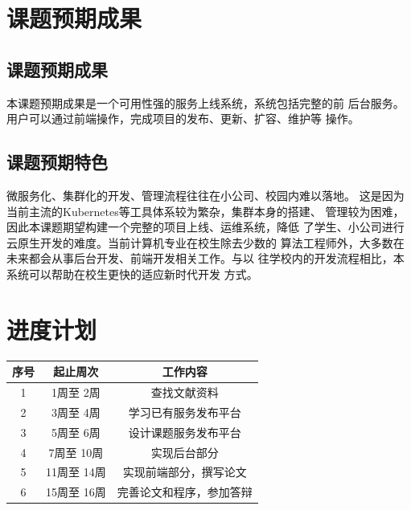 \documentclass{article}
\begin{document}
\section{课题预期成果}

\subsection{课题预期成果}
  本课题预期成果是一个可用性强的服务上线系统，系统包括完整的前
后台服务。用户可以通过前端操作，完成项目的发布、更新、扩容、维护等
操作。
\subsection{课题预期特色}
  微服务化、集群化的开发、管理流程往往在小公司、校园内难以落地。
这是因为当前主流的Kubernetes等工具体系较为繁杂，集群本身的搭建、
管理较为困难，因此本课题期望构建一个完整的项目上线、运维系统，降低
了学生、小公司进行云原生开发的难度。当前计算机专业在校生除去少数的
算法工程师外，大多数在未来都会从事后台开发、前端开发相关工作。与以
往学校内的开发流程相比，本系统可以帮助在校生更快的适应新时代开发
方式。

\section{进度计划}
\begin{center}
  \begin{tabular}{|c|c|c|}
    \hline 序号&起止周次&工作内容\\
    \hline 1&1周至  2周& 查找文献资料 \\
    \hline 2&3周至  4周& 学习已有服务发布平台 \\
    \hline 3&5周至  6周& 设计课题服务发布平台 \\
    \hline 4&7周至  10周& 实现后台部分 \\
    \hline 5&11周至 14周& 实现前端部分，撰写论文 \\
    \hline 6&15周至 16周& 完善论文和程序，参加答辩 \\
    \hline
  \end{tabular}
\end{center}

\newpage
\end{document}
